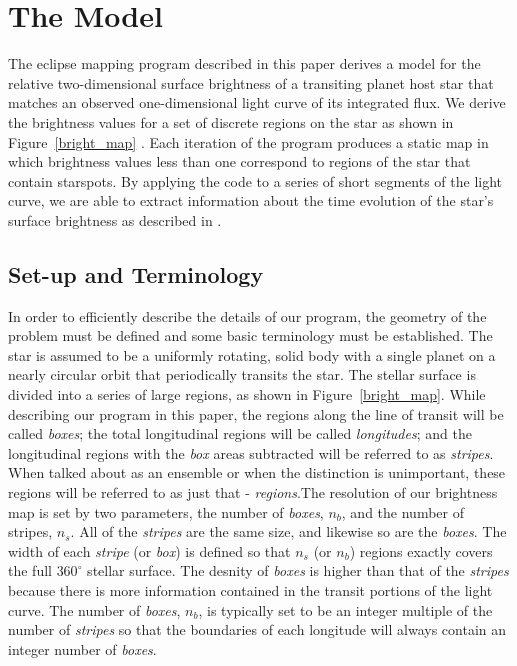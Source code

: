 

\section{The Model \label{terminology}}
The eclipse mapping program described in this paper derives a model for the relative two-dimensional surface brightness of a transiting planet host star that matches an observed one-dimensional light curve of its integrated flux. We derive the brightness values for a set of discrete regions on the star as shown in Figure~\ref{bright_map} \citep{Huber2009}. Each iteration of the program produces a static map in which brightness values less than one correspond to regions of the star that contain starspots.  By applying the code to a series of short segments of the light curve, we are able to extract information about the time evolution of the star's surface brightness as described in \citet{Huber2010}. 

\subsection{Set-up and Terminology}

In order to efficiently describe the details of our program, the geometry of the problem must be defined and some basic terminology must be established. The star is assumed to be a uniformly rotating,  solid body with a single planet on a nearly circular orbit that periodically transits the star. The stellar surface is divided into a series of large regions, as shown in Figure~\ref{bright_map}.  While describing our program in this paper, the regions along the line of transit will be called {\it boxes}; the total longitudinal regions will be called {\it longitudes}; and the longitudinal regions with the {\it box} areas subtracted will be referred to as {\it stripes}. When talked about as an ensemble or when the distinction is unimportant, these regions will be referred to as just that - {\it regions}.The resolution of our brightness map is set by two parameters, the number of {\it boxes}, $n_b$, and  the number of stripes, $n_s$.  All of the {\it stripes} are the same size, and likewise so are the {\it boxes}. The width of each {\it stripe} (or {\it box}) is defined so that $n_s$ (or $n_b$) regions exactly covers the full $360^{\circ}$ stellar surface. The desnity of {\it boxes} is higher than that of the {\it stripes} because there is more information contained in the transit portions of the light curve. The number of {\it boxes}, $n_b$, is typically set to be an integer multiple of the number of {\it stripes} so that the boundaries of each longitude will always contain an integer number of {\it boxes}. 

